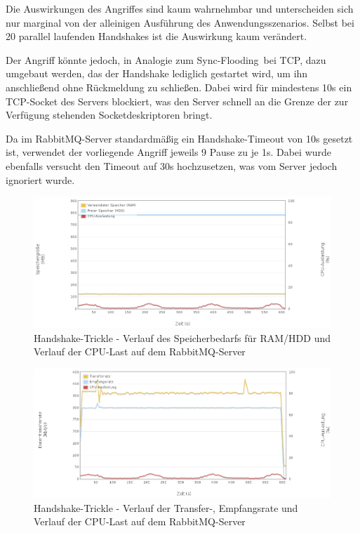 \documentclass[	a4paper,
			11pt,
			oneside,
			parskip]{scrartcl}
\begin{document}
	
	\clearpage
		{%
		  \newline
		  \newline
		  \newline
		}{%
		 Die Auswirkungen des Angriffes sind kaum wahrnehmbar und unterscheiden sich nur marginal von der alleinigen Ausführung des Anwendungsszenarios.
		 Selbst bei 20 parallel laufenden Handshakes ist die Auswirkung kaum verändert.\newline
		 
		 Der Angriff könnte jedoch, in Analogie zum \glqq Sync-Flooding\grqq\ bei TCP, dazu umgebaut werden, das der Handshake lediglich gestartet wird, um ihn anschließend ohne Rückmeldung zu schließen.
		 Dabei wird für mindestens 10s ein TCP-Socket des Servers blockiert, was den Server schnell an die Grenze der zur Verfügung stehenden Socketdeskriptoren bringt.
		}{%
		 Da im RabbitMQ-Server standardmäßig ein Handshake-Timeout von 10s gesetzt ist, verwendet der vorliegende Angriff jeweils 9 Pause
		 zu je 1s. Dabei wurde ebenfalls versucht den Timeout auf 30s hochzusetzen, was vom Server jedoch ignoriert wurde.
		}
		
		\begin{figure}[!htb]
			\centering
			\includegraphics[width=\textwidth]{img/handshake/handshake_server1.png}
			\caption{Handshake-Trickle - Verlauf des Speicherbedarfs für RAM/HDD und Verlauf der CPU-Last auf dem RabbitMQ-Server}
			\label{fig:handshake-server1}
		\end{figure}
		
		\begin{figure}[!htb]
			\centering
			\includegraphics[width=\textwidth]{img/handshake/handshake_server2.png}
			\caption{Handshake-Trickle - Verlauf der Transfer-, Empfangsrate und Verlauf der CPU-Last auf dem RabbitMQ-Server}
			\label{fig:handshake-server2}
		\end{figure}
		
\end{document}
